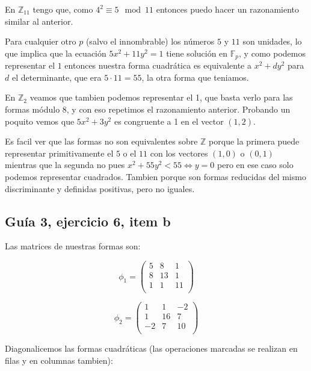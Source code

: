 \documentclass[12pt]{amsart}
\newcommand{\ZZ}{\mathbb{Z}}
\newcommand{\FF}{\mathbb{F}}
\newcommand{\lp}{\left(}
\newcommand{\rp}{\right)}
\theoremstyle{plain}
\begin{document}
En $\ZZ_{11}$ tengo que, como $4^2 \equiv 5\mod 11$ 
entonces puedo hacer un razonamiento similar al anterior.

Para cualquier otro $p$ (salvo el innombrable) los números 
$5$ y $11$ son unidades, lo que implica que la ecuación 
$5x^2 + 11y^2=1$ tiene solución en $\FF_p$, y como podemos
representar el $1$ entonces nuestra forma cuadrática es
equivalente a $x^2+ d y^2$ para $d$ el determinante, que 
era $5\cdot 11 = 55$, la otra forma que teniamos. 

En $\ZZ_2$ veamos que tambien podemos representar el 1, que 
basta verlo para las formas módulo 8, y con eso repetimos el 
razonamiento anterior. Probando un poquito vemos que $5x^2
+3y^2$ es congruente a 1 en el vector $(1,2)$.

Es facil ver que las formas no son equivalentes sobre $\ZZ$
porque la primera puede representar primitivamente el $5$ o el 
$11$ con los vectores $(1,0)$ o $(0,1)$ mientras que la segunda
no pues $x^2 + 55y^2 < 55 \iff y=0$ pero en ese caso solo 
podemos representar cuadrados. Tambien porque son formas
reducidas del mismo discriminante y definidas positivas, pero 
no iguales.

\subsection*{Guía 3, ejercicio 6, item b}

Las matrices de nuestras formas son:

\begin{multicols}{2}
$$\phi_1 = \lp
\begin{matrix}
    5&8&1 \\
    8&13&1 \\
    1&1&11 \\
\end{matrix}\rp$$

$$\phi_2 = \lp
\begin{matrix}
    1&1&-2 \\
    1&16&7 \\
    -2&7&10 \\
\end{matrix}\rp$$
\end{multicols}

Diagonalicemos las formas cuadráticas (las operaciones 
marcadas se realizan en filas y en columnas tambien):
\end{document}
